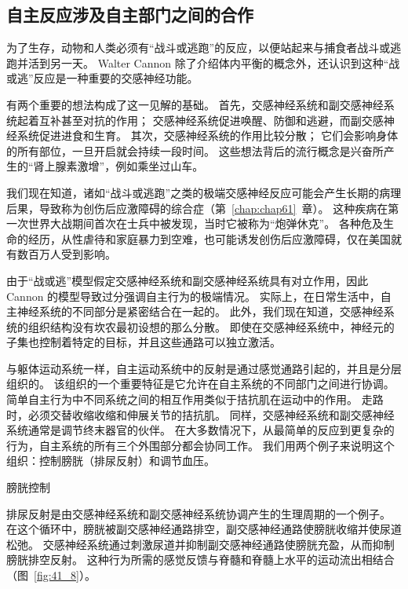 \subsection{自主反应涉及自主部门之间的合作}

为了生存，动物和人类必须有“战斗或逃跑”的反应，以便站起来与捕食者战斗或逃跑并活到另一天。
Walter Cannon 除了介绍体内平衡的概念外，还认识到这种“战或逃”反应是一种重要的交感神经功能。


有两个重要的想法构成了这一见解的基础。
首先，交感神经系统和副交感神经系统起着互补甚至对抗的作用；
交感神经系统促进唤醒、防御和逃避，而副交感神经系统促进进食和生育。
其次，交感神经系统的作用比较分散；
它们会影响身体的所有部位，一旦开启就会持续一段时间。
这些想法背后的流行概念是兴奋所产生的“肾上腺素激增”，例如乘坐过山车。


我们现在知道，诸如“战斗或逃跑”之类的极端交感神经反应可能会产生长期的病理后果，导致称为创伤后应激障碍的综合症（第~\ref{chap:chap61}~章）。
这种疾病在第一次世界大战期间首次在士兵中被发现，当时它被称为“炮弹休克”。
各种危及生命的经历，从性虐待和家庭暴力到空难，也可能诱发创伤后应激障碍，仅在美国就有数百万人受到影响。


由于“战或逃”模型假定交感神经系统和副交感神经系统具有对立作用，因此 Cannon 的模型导致过分强调自主行为的极端情况。
实际上，在日常生活中，自主神经系统的不同部分是紧密结合在一起的。
此外，我们现在知道，交感神经系统的组织结构没有坎农最初设想的那么分散。
即使在交感神经系统中，神经元的子集也控制着特定的目标，并且这些通路可以独立激活。


与躯体运动系统一样，自主运动系统中的反射是通过感觉通路引起的，并且是分层组织的。
该组织的一个重要特征是它允许在自主系统的不同部门之间进行协调。
简单自主行为中不同系统之间的相互作用类似于拮抗肌在运动中的作用。
走路时，必须交替收缩收缩和伸展关节的拮抗肌。
同样，交感神经系统和副交感神经系统通常是调节终末器官的伙伴。
在大多数情况下，从最简单的反应到更复杂的行为，自主系统的所有三个外围部分都会协同工作。
我们用两个例子来说明这个组织：控制膀胱（排尿反射）和调节血压。


膀胱控制

排尿反射是由交感神经系统和副交感神经系统协调产生的生理周期的一个例子。
在这个循环中，膀胱被副交感神经通路排空，副交感神经通路使膀胱收缩并使尿道松弛。
交感神经系统通过刺激尿道并抑制副交感神经通路使膀胱充盈，从而抑制膀胱排空反射。
这种行为所需的感觉反馈与脊髓和脊髓上水平的运动流出相结合（图~\ref{fig:41_8}）。


